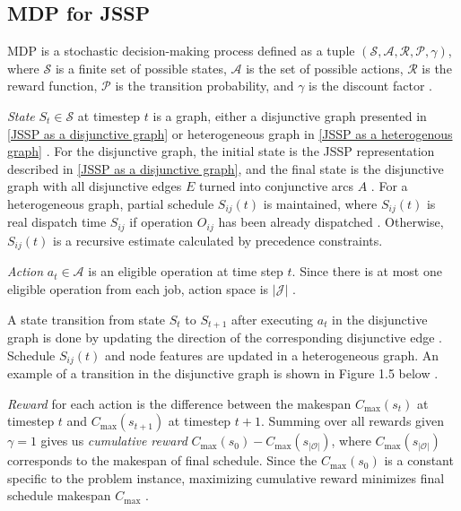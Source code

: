 \subsection{MDP for JSSP}

MDP is a stochastic decision-making process defined as a tuple $(\mathcal{S}, \mathcal{A}, \mathcal{R}, \mathcal{P}, \gamma)$, where $\mathcal{S}$ is a finite set of possible states, $\mathcal{A}$ is the set of possible actions, $\mathcal{R}$ is the reward function,  $\mathcal{P}$ is the transition probability, and $\gamma$ is the discount factor \cite{10226873, jssp_rl_env}. 
\par
\textit{State} $S_t \in \mathcal{S}$ at timestep $t$ is a graph, either a disjunctive graph presented in \ref{JSSP as a disjunctive graph} \cite{zhang2020learning} or heterogeneous graph in \ref{JSSP as a heterogenous graph} \cite{10226873}. For the disjunctive graph, the initial state is the JSSP representation described in \ref{JSSP as a disjunctive graph}, and the final state is the disjunctive graph with all disjunctive edges $E$ turned into conjunctive arcs $A$ \cite{zhang2020learning}. For a heterogeneous graph, partial schedule $S_{ij}(t)$ is maintained, where $S_{ij}(t)$ is real dispatch time $S_{ij}$ if operation $O_{ij}$ has been already dispatched \cite{9826438}. Otherwise, $S_{ij}(t)$ is a recursive estimate calculated by precedence constraints.
\par
\textit{Action} $a_t \in \mathcal{A}$ is an eligible operation at time step $t$. Since there is at most one eligible operation from each job, action space is $\left|\mathcal{J}\right|$ \cite{zhang2020learning}.
\par
A state transition from state $S_t$ to $S_{t+1}$ after executing $a_t$ in the disjunctive graph is done by updating the direction of the corresponding disjunctive edge \cite{zhang2020learning}. Schedule $S_{ij}(t)$ and node features are updated in a heterogeneous graph. An example of a transition in the disjunctive graph is shown in Figure 1.5 below \cite{zhang2020learning}.

\textit{Reward} for each action is the difference between the makespan $C_\text{max}(s_t)$ at timestep $t$ and $C_\text{max}(s_{t+1})$ at timestep $t+1$. Summing over all rewards given $\gamma = 1$ gives us \textit{cumulative reward} $C_\text{max}(s_0) - C_\text{max}(s_{\left|\mathcal{O}\right|})$, where $C_\text{max}(s_{\left|\mathcal{O}\right|})$ corresponds to the makespan of final schedule. Since the $C_\text{max}(s_0)$ is a constant specific to the problem instance, maximizing cumulative reward minimizes final schedule makespan $C_\text{max}$ \cite{zhang2020learning, 10226873, 9826438}. 

